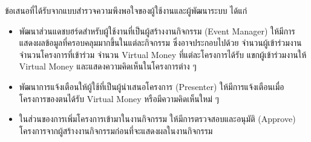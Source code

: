 ข้อเสนอที่ได้รับจากแบบสำรวจความพึงพอใจของผู้ใช้งานและผู้พัฒนาระบบ ได้แก่
\begin{itemize}
    \item พัฒนาส่วนแดชบฮร์ดสำหรับผู้ใช้งานที่เป็นผู้สร้างงานกิจกรรม (Event Manager) ให้มีการแสดงผลข้อมูลที่ครอบคลุมมากขึ้นในแต่ละกิจกรรม ซึ่งอาจประกอบไปด้วย จำนวนผู้เข้าร่วมงาน จำนวนโครงการที่เข้าร่วม จำนวน Virtual Money ที่แต่ละโครงการได้รับ แขกผู้เข้าร่วมงานให้ Virtual Money และแสดงความคิดเห็นในโครงการต่าง ๆ
    \item พัฒนาการแจ้งเตือนให้ผู้ใช้ที่เป็นผู้นำเสนอโครงการ (Presenter) ให้มีการแจ้งเตือนเมื่อโครงการของตนได้รับ Virtual Money หรือมีความคิดเห็นใหม่ ๆ
    \item ในส่วนของการเพิ่มโครงการเข้ามาในงานกิจกรรม ให้มีการตรวจสอบและอนุมัติ (Approve) โครงการจากผู้สร้างงานกิจกรรมก่อนที่จะแสดงผลในงานกิจกรรม
\end{itemize}
